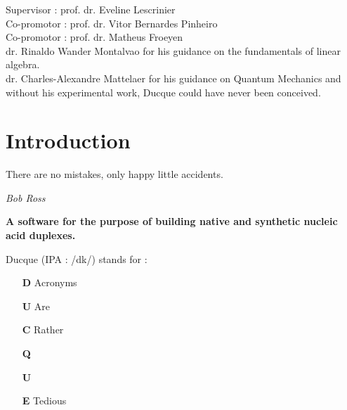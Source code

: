 \pagebreak

\vspace*{\fill}

\begin{center}
Supervisor : prof. dr. Eveline Lescrinier\\
Co-promotor : prof. dr. Vitor Bernardes Pinheiro\\
Co-promotor : prof. dr. Matheus Froeyen\\
\vspace{3mm}
dr. Rinaldo Wander Montalvao for his guidance on the fundamentals of linear algebra.\\
dr. Charles-Alexandre Mattelaer for his guidance on Quantum Mechanics and without his experimental work, Ducque could have never been conceived.\\

\end{center}

\vspace*{\fill}


\pagebreak
\section{Introduction}


\epigraph{ There are no mistakes, only happy little accidents.}{\textit{Bob Ross}}

\begin{center}
\textbf{A software for the purpose of building native and synthetic nucleic acid duplexes.}\\
\end{center}

\noindent Ducque \colorbox{gray1}{(IPA : /dk/)} stands for :
\vspace{-1.5mm}
\begin{itemize}[leftmargin=*]
    \setlength\itemsep{-1.5mm}
    \item[\textbf{D}] Acronyms %
    \item[\textbf{U}] Are      %
    \item[\textbf{C}] Rather   %
    \item[\textbf{Q}]          %
    \item[\textbf{U}]          %
    \item[\textbf{E}] Tedious  %
\end{itemize}

